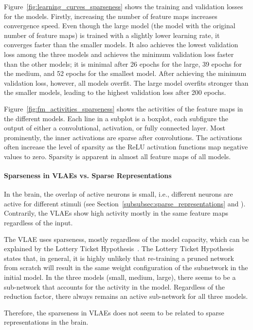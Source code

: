 Figure~\ref{fig:learning_curves_sparseness} shows the training and validation losses for the models.
Firstly, increasing the number of feature maps increases convergence speed.
Even though the large model (the model with the original number of feature maps) is trained with a slightly lower learning rate, it converges faster than the smaller models.
It also achieves the lowest validation loss among the three models and achieves the minimum validation loss faster than the other models; it is minimal after 26 epochs for the large, 39 epochs for the medium, and 52 epochs for the smallest model.
After achieving the minimum validation loss, however, all models overfit.
The large model overfits stronger than the smaller models, leading to the highest validation loss after 200 epochs.

Figure~\ref{fig:fm_activities_sparseness} shows the activities of the feature maps in the different models.
Each line in a subplot is a boxplot, each subfigure the output of either a convolutional, activation, or fully connected layer.
Most prominently, the inner activations are sparse after convolutions.
The activations often increase the level of sparsity as the ReLU activation functions map negative values to zero.
Sparsity is apparent in almost all feature maps of all models.

\paragraph{Sparseness in \acp{VLAE} vs. Sparse Representations}
In the brain, the overlap of active neurons is small, i.e., different neurons are active for different stimuli (see Section~\ref{subsubsec:sparse_representations} and \citet{yoshida2020natural}).
Contrarily, the \acp{VLAE} show high activity mostly in the same feature maps regardless of the input.

The \ac{VLAE} uses sparseness, mostly regardless of the model capacity, which can be explained by the Lottery Ticket Hypothesis~\citep{frankle2018lottery}.
The Lottery Ticket Hypothesis states that, in general, it is highly unlikely that re-training a pruned network from scratch will result in the same weight configuration of the subnetwork in the initial model.
In the three models (small, medium, large), there seems to be a sub-network that accounts for the activity in the model.
Regardless of the reduction factor, there always remains an active sub-network for all three models.

Therefore, the sparseness in \acp{VLAE} does not seem to be related to sparse representations in the brain.

